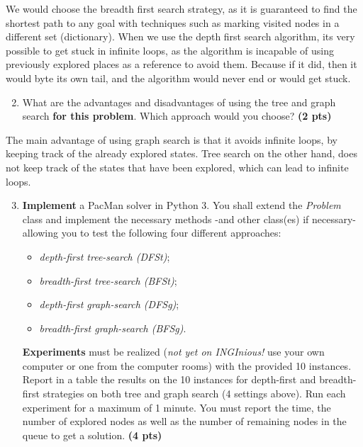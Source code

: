 \documentclass[11pt,a4paper]{../template/report}
\begin{document}
\begin{answer}
We would choose the breadth first search strategy, as it is guaranteed to find the shortest path to any goal with techniques such as marking visited nodes in a different set (dictionary).
When we use the depth first search algorithm, its very possible to get stuck in infinite loops, as the algorithm is incapable of using previously explored places as a reference to avoid them. 
Because if it did, then it would byte its own tail, and the algorithm would never end or would get stuck.
\end{answer}



\begin{enumerate}
\setcounter{enumi}{1}
\begin{enumerate}
\setcounter{enumii}{1}
    \item What are the advantages and disadvantages of using the tree and graph search \textbf{for this problem}. Which approach would you choose? \textbf{(2 pts)}
\end{enumerate}
\end{enumerate}

\begin{answers}[4cm]
The main advantage of using graph search is that it avoids infinite loops, by keeping track of the already explored states. Tree search on the other hand, does not keep track of the states that have been explored, which can lead to infinite loops.
\end{answers}



\begin{enumerate}
\setcounter{enumi}{2}
    \item \textbf{Implement} a PacMan solver in Python 3.
			You shall extend the \emph{Problem} class and implement the necessary methods -and other class(es) if necessary- allowing you to test the following four different approaches: 
			\begin{itemize}
			\item \textit{depth-first tree-search (DFSt)};
			\item \textit{breadth-first tree-search (BFSt)};
			\item \textit{depth-first graph-search (DFSg)};
			\item \textit{breadth-first graph-search (BFSg)}. 
			\end{itemize}

    \textbf{Experiments} must be realized (\textit{not yet on INGInious!} use your own computer or one from the computer rooms) with the provided 10 instances. Report in a table the results on the 10 instances for depth-first and breadth-first strategies on both tree and graph search (4 settings above). Run each experiment for a maximum of 1 minute. You must report the time, the number of explored nodes as well as the number of remaining nodes in the queue to get a solution. \textbf{(4 pts)}
\end{enumerate}
\end{document}
